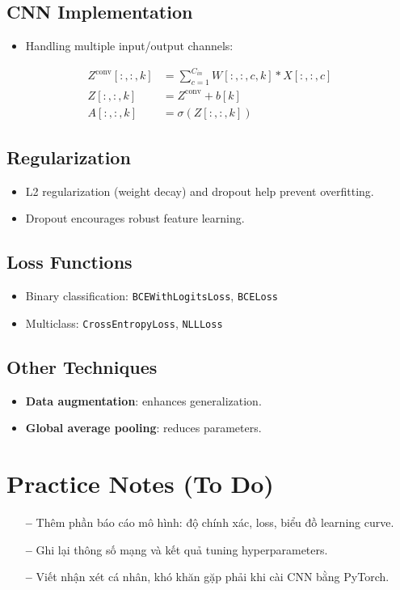 \documentclass[12pt]{article}
\begin{document}
\subsection{CNN Implementation}
\begin{itemize}
    \item Handling multiple input/output channels:
\end{itemize}

\begin{align*}
Z^{\text{conv}}[:,:,k] &= \sum_{c=1}^{C_{in}} W[:,:,c,k] * X[:,:,c] \\
Z[:,:,k] &= Z^{\text{conv}} + b[k] \\
A[:,:,k] &= \sigma(Z[:,:,k])
\end{align*}

\subsection{Regularization}
\begin{itemize}
    \item L2 regularization (weight decay) and dropout help prevent overfitting.
    \item Dropout encourages robust feature learning.
\end{itemize}

\subsection{Loss Functions}
\begin{itemize}
    \item Binary classification: \texttt{BCEWithLogitsLoss}, \texttt{BCELoss}
    \item Multiclass: \texttt{CrossEntropyLoss}, \texttt{NLLLoss}
\end{itemize}

\subsection{Other Techniques}
\begin{itemize}
    \item \textbf{Data augmentation}: enhances generalization.
    \item \textbf{Global average pooling}: reduces parameters.
\end{itemize}

\section{Practice Notes (To Do)}
\vspace{-0.5em}
\begin{itemize}
    \item [\textbf{--}] Thêm phần báo cáo mô hình: độ chính xác, loss, biểu đồ learning curve.
    \item [\textbf{--}] Ghi lại thông số mạng và kết quả tuning hyperparameters.
    \item [\textbf{--}] Viết nhận xét cá nhân, khó khăn gặp phải khi cài CNN bằng PyTorch.
\end{itemize}
\end{document}

